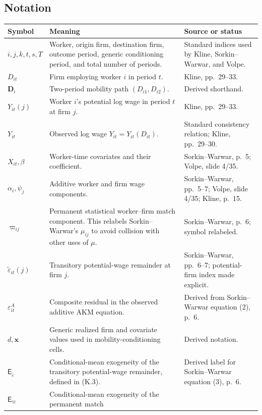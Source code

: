 \documentclass[11pt]{article}
\begin{document}
\subsection{Notation}

\begin{longtable}{p{}p{}p{}}
\textbf{Symbol} & \textbf{Meaning} & \textbf{Source or status} \\
\hline
\(i,j,k,t,s,T\) & Worker, origin firm, destination firm, outcome period,
generic conditioning period, and total number of periods. & Standard
indices used by Kline, Sorkin--Warwar, and Volpe. \\
\(D_{it}\) & Firm employing worker \(i\) in period \(t\). & Kline,
pp.\ 29--33. \\
\(\mathbf D_i\) & Two-period mobility path
\((D_{i1},D_{i2})\). & Derived shorthand. \\
\(Y_{it}(j)\) & Worker \(i\)'s potential log wage in period \(t\) at firm
\(j\). & Kline, pp.\ 29--33. \\
\(Y_{it}\) & Observed log wage
\(Y_{it}=Y_{it}(D_{it})\). & Standard consistency relation; Kline,
pp.\ 29--30. \\
\(X_{it},\beta\) & Worker-time covariates and their coefficient. &
Sorkin--Warwar, p.\ 5; Volpe, slide 4/35. \\
\(\alpha_i,\psi_j\) & Additive worker and firm wage components. &
Sorkin--Warwar, pp.\ 5--7; Volpe, slide 4/35; Kline, p.\ 15. \\
\(\varpi_{ij}\) & Permanent statistical worker--firm match component.  This
relabels Sorkin--Warwar's \(\mu_{ij}\) to avoid collision with other uses of
\(\mu\). & Sorkin--Warwar, p.\ 6; symbol relabeled. \\
\(\widetilde\varepsilon_{it}(j)\) & Transitory potential-wage remainder at
firm \(j\). & Sorkin--Warwar, pp.\ 6--7; potential-firm index made
explicit. \\
\(\varepsilon^A_{it}\) & Composite residual in the observed additive AKM
equation. & Derived from Sorkin--Warwar equation (2), p.\ 6. \\
\(d,\mathbf x\) & Generic realized firm and covariate values used in
mobility-conditioning cells. & Derived notation. \\
\(\mathsf E_{\widetilde\varepsilon}\) & Conditional-mean exogeneity of the
transitory potential-wage remainder, defined in (K.3). & Derived label for
Sorkin--Warwar equation (3), p.\ 6. \\
\(\mathsf E_{\varpi}\) & Conditional-mean exogeneity of the permanent match

\end{longtable}
\end{document}
